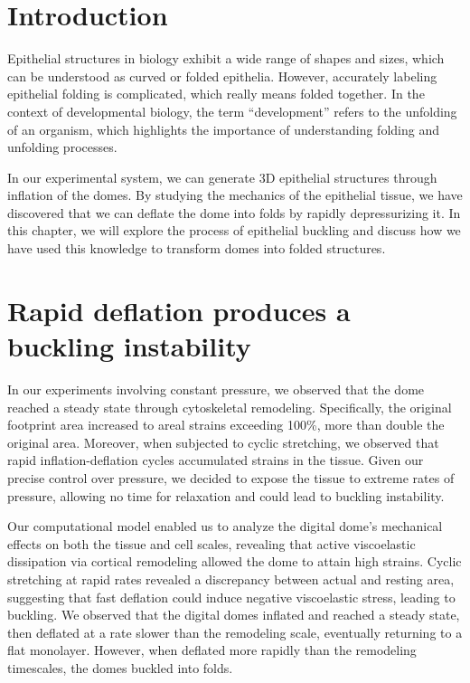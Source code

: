 \hypertarget{introduction}{%
\section{Introduction}\label{introduction5}}

Epithelial structures in biology exhibit a wide range of shapes and
sizes, which can be understood as curved or folded epithelia. However,
accurately labeling epithelial folding is complicated, which really
means folded together. In the context of developmental biology, the term
``development'' refers to the unfolding of an organism, which highlights
the importance of understanding folding and unfolding processes.

In our experimental system, we can generate 3D epithelial structures
through inflation of the domes. By studying the mechanics of the
epithelial tissue, we have discovered that we can deflate the dome into
folds by rapidly depressurizing it. In this chapter, we will explore the
process of epithelial buckling and discuss how we have used this
knowledge to transform domes into folded structures.

\hypertarget{rapid-deflation-produces-a-buckling-instability}{%
	\section{Rapid deflation produces a buckling
		instability}\label{rapid-deflation-produces-a-buckling-instability}}

In our experiments involving constant pressure, we observed that the
dome reached a steady state through cytoskeletal remodeling.
Specifically, the original footprint area increased to areal strains
exceeding 100\%, more than double the original area. Moreover, when
subjected to cyclic stretching, we observed that rapid
inflation-deflation cycles accumulated strains in the tissue. Given our
precise control over pressure, we decided to expose the tissue to
extreme rates of pressure, allowing no time for relaxation and could
lead to buckling instability.

Our computational model enabled us to analyze the digital dome's
mechanical effects on both the tissue and cell scales, revealing that
active viscoelastic dissipation via cortical remodeling allowed the dome
to attain high strains. Cyclic stretching at rapid rates revealed a
discrepancy between actual and resting area, suggesting that fast
deflation could induce negative viscoelastic stress, leading to
buckling. We observed that the digital domes inflated and reached a
steady state, then deflated at a rate slower than the remodeling scale,
eventually returning to a flat monolayer. However, when deflated more
rapidly than the remodeling timescales, the domes buckled into folds.

